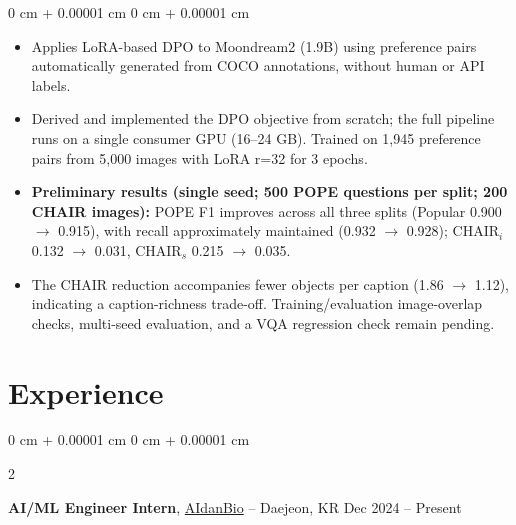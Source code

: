 \documentclass[10pt, letterpaper]{article}
\newenvironment{highlights}{
    \begin{itemize}[
        topsep=0.10 cm,
        parsep=0.10 cm,
        partopsep=0pt,
        itemsep=0pt,
        leftmargin=0 cm + 10pt
    ]
}{
    \end{itemize}
} %
\newenvironment{onecolentry}{
    \begin{adjustwidth}{
        0 cm + 0.00001 cm
    }{
        0 cm + 0.00001 cm
    }
}{
    \end{adjustwidth}
} %
\newenvironment{twocolentry}[2][]{
    \onecolentry
    \def\secondColumn{#2}
    \setcolumnwidth{\fill, 4.5 cm}
    \begin{paracol}{2}
}{
    \switchcolumn \raggedleft \secondColumn
    \end{paracol}
    \endonecolentry
} %
\begin{document}
        \vspace{0.10 cm}
        \begin{onecolentry}
            \begin{highlights}
                \item Applies LoRA-based DPO to Moondream2 (1.9B) using preference pairs automatically generated from COCO annotations, without human or API labels.
                \item Derived and implemented the DPO objective from scratch; the full pipeline runs on a single consumer GPU (16--24 GB). Trained on 1,945 preference pairs from 5,000 images with LoRA r=32 for 3 epochs.
                \item \textbf{Preliminary results (single seed; 500 POPE questions per split; 200 CHAIR images):} POPE F1 improves across all three splits (Popular 0.900 $\rightarrow$ 0.915), with recall approximately maintained (0.932 $\rightarrow$ 0.928); CHAIR$_i$ 0.132 $\rightarrow$ 0.031, CHAIR$_s$ 0.215 $\rightarrow$ 0.035.
                \item The CHAIR reduction accompanies fewer objects per caption (1.86 $\rightarrow$ 1.12), indicating a caption-richness trade-off. Training/evaluation image-overlap checks, multi-seed evaluation, and a VQA regression check remain pending.
            \end{highlights}
        \end{onecolentry}

    \newpage

    \section{Experience}

        \begin{twocolentry}{
            Dec 2024 – Present
        }
            \textbf{AI/ML Engineer Intern}, \href{http://aidanbio.com/}{\textcolor{linkBlue}{AIdanBio}} -- Daejeon, KR\end{twocolentry}
\end{document}
